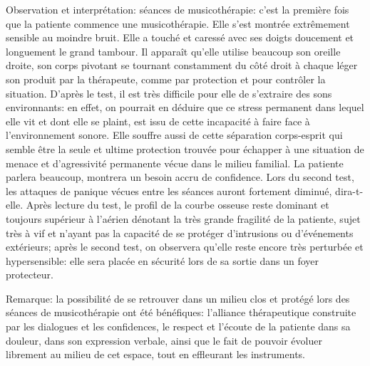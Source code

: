            Observation et interprétation:  séances de musicothérapie: c'est la première fois que la patiente 
            commence une  musicothérapie.
            Elle s'est montrée extrêmement sensible au 
            moindre bruit.
            Elle a touché et caressé avec ses doigts doucement et longuement le grand tambour. 
            Il apparaît qu'elle utilise beaucoup son oreille droite, son corps pivotant  se tournant 
            constamment du 
            côté droit à chaque léger son produit par la thérapeute, comme par protection et  pour contrôler la 
            situation. 
            D'après le test, il est très difficile pour elle de s'extraire des sons environnants: en effet, on 
            pourrait en 
            déduire que ce stress permanent dans lequel elle vit et dont elle se plaint, est issu de cette 
            incapacité à 
            faire face à l'environnement sonore. Elle souffre aussi de cette séparation corps-esprit qui semble 
            être  
      la seule et ultime protection trouvée pour échapper à une situation  de menace  et d'agressivité 
      permanente vécue dans le milieu familial.
            La patiente parlera beaucoup, montrera un besoin accru de confidence. Lors du second test,  les 
            attaques de panique vécues entre les séances auront fortement 
            diminué, dira-t-elle. Après lecture du test, le profil de la courbe osseuse reste dominant et 
            toujours  
            supérieur à l'aérien dénotant la très grande fragilité de la patiente, 
            sujet très à vif et n'ayant pas la capacité de se protéger d'intrusions ou d'événements extérieurs; 
            après le second 
            test, on observera  qu'elle reste encore très 
            perturbée et hypersensible: elle sera placée en sécurité 
            lors de sa sortie dans un foyer protecteur. 
            
            
            Remarque: la possibilité de se retrouver dans un milieu clos et protégé lors des séances de 
            musicothérapie ont été bénéfiques:  l'alliance thérapeutique construite par les dialogues et les 
            confidences,  le respect et l'écoute de la patiente dans sa douleur, dans son expression verbale, 
            ainsi 
            que le fait  de pouvoir 
            évoluer librement au milieu de cet espace, tout en effleurant 
            les instruments.
